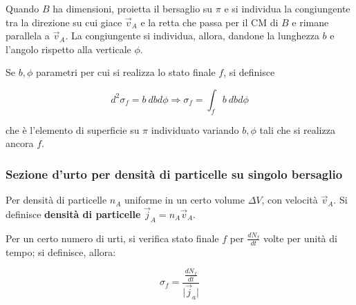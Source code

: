 \documentclass[10pt, a4paper]{scrartcl}
\numberwithin{equation}{subsection}
\theoremstyle{style1}
\newenvironment{boxenv}[1][]{
    \begin{eqbox}[#1]
    }{
   \end{eqbox}
}
\begin{document}
Quando $B$ ha dimensioni, proietta il bersaglio su $\pi$ e si individua la congiungente tra la direzione su cui giace $\vec{v}_A$ e la retta che passa per il CM di $B$ e rimane parallela a $\vec{v}_A$. La congiungente si individua, allora, dandone la lunghezza $b$ e l'angolo rispetto alla verticale $\phi $.

Se $b,\phi $ parametri per cui si realizza lo stato finale $f$, si definisce
\begin{boxenv}[]
	\begin{equation}\label{sb}
d^2\sigma _f = b\ db d\phi \Rightarrow \sigma _f = \int_{f} b\ db d\phi 
\end{equation}
\end{boxenv}
\noindent che \`e l'elemento di superficie su $\pi$ individuato variando $b,\phi $ tali che si realizza ancora $f$.
\subsubsection{Sezione d'urto per densit\`a di particelle su singolo bersaglio}
Per densit\`a di particelle $n_A$ uniforme in un certo volume $\Delta V$, con velocit\`a $\vec{v}_A$. Si definisce \textbf{densit\`a di particelle} $\vec{j}_A = n_A \vec{v}_A$.

Per un certo numero di urti, si verifica stato finale $f$ per $\frac{d N_f}{d t} $ volte per unit\`a di tempo; si definisce, allora:
\begin{boxenv}[]
\begin{equation}
	\sigma _f = \frac{\frac{d N_f}{d t} }{\lvert \vec{j}_a \rvert }
\end{equation}
\end{boxenv}
\end{document}
